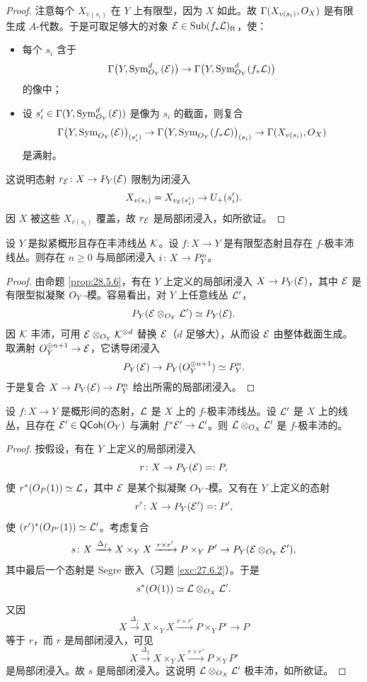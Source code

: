 \begin{proof}
注意每个 $X_{v(s_i)}$ 在 $Y$ 上有限型，因为 $X$ 如此。故 $\Gamma(X_{v(s_i)},O_X)$ 是有限生成 $A$-代数。于是可取足够大的对象 $\mathcal{E}\in\operatorname{Sub}(f_*\mathcal{L})_{\mathrm{ft}}$，使：
\begin{itemize}[leftmargin=1.6em,itemsep=0.25ex]
  \item 每个 $s_i$ 含于
  \[
  \Gamma\bigl(Y,\operatorname{Sym}^d_{O_Y}(\mathcal{E})\bigr)\to\Gamma\bigl(Y,\operatorname{Sym}^d_{O_Y}(f_*\mathcal{L})\bigr)
  \]
  的像中；
  \item 设 $s'_i\in\Gamma(Y,\operatorname{Sym}^d_{O_Y}(\mathcal{E}))$ 是像为 $s_i$ 的截面，则复合
  \[
  \Gamma\bigl(Y,\operatorname{Sym}_{O_Y}(\mathcal{E})\bigr)_{(s'_i)}\to\Gamma\bigl(Y,\operatorname{Sym}_{O_Y}(f_*\mathcal{L})\bigr)_{(s_i)}\to\Gamma(X_{v(s_i)},O_X)
  \]
  是满射。
\end{itemize}
这说明态射 $r_{\mathcal{E}}\colon X\to P_Y(\mathcal{E})$ 限制为闭浸入
\[
X_{v(s_i)}=X_{v_{\mathcal{E}}(s'_i)}\to U_+(s'_i).
\]
因 $X$ 被这些 $X_{v(s_i)}$ 覆盖，故 $r_{\mathcal{E}}$ 是局部闭浸入，如所欲证。
\end{proof}

\begin{corollary}\label{cor:28.5.7}
设 $Y$ 是拟紧概形且存在丰沛线丛 $\mathcal{K}$。设 $f\colon X\to Y$ 是有限型态射且存在 $f$-极丰沛线丛。则存在 $n\ge 0$ 与局部闭浸入 $i\colon X\to P^n_Y$。
\end{corollary}

\begin{proof}
由命题 \ref{prop:28.5.6}，有在 $Y$ 上定义的局部闭浸入 $X\to P_Y(\mathcal{E})$，其中 $\mathcal{E}$ 是有限型拟凝聚 $O_Y$-模。容易看出，对 $Y$ 上任意线丛 $\mathcal{L}'$，
\[
P_Y(\mathcal{E}\otimes_{O_Y}\mathcal{L}')\simeq P_Y(\mathcal{E}).
\]
因 $\mathcal{K}$ 丰沛，可用 $\mathcal{E}\otimes_{O_Y}\mathcal{K}^{\otimes d}$ 替换 $\mathcal{E}$（$d$ 足够大），从而设 $\mathcal{E}$ 由整体截面生成。取满射 $O_Y^{\oplus n+1}\to\mathcal{E}$，它诱导闭浸入
\[
P_Y(\mathcal{E})\to P_Y(O_Y^{\oplus n+1})\simeq P^n_Y.
\]
于是复合 $X\to P_Y(\mathcal{E})\to P^n_Y$ 给出所需的局部闭浸入。
\end{proof}

\begin{lemma}\label{lem:28.5.8}
设 $f\colon X\to Y$ 是概形间的态射，$\mathcal{L}$ 是 $X$ 上的 $f$-极丰沛线丛。设 $\mathcal{L}'$ 是 $X$ 上的线丛，且存在 $\mathcal{E}'\in\mathsf{QCoh}(O_Y)$ 与满射 $f^*\mathcal{E}'\to\mathcal{L}'$。则 $\mathcal{L}\otimes_{O_X}\mathcal{L}'$ 是 $f$-极丰沛的。
\end{lemma}

\begin{proof}
按假设，有在 $Y$ 上定义的局部闭浸入
\[
r\colon X\to P_Y(\mathcal{E})=:P,
\]
使 $r^*(O_P(1))\simeq\mathcal{L}$，其中 $\mathcal{E}$ 是某个拟凝聚 $O_Y$-模。又有在 $Y$ 上定义的态射
\[
r'\colon X\to P_Y(\mathcal{E}')=:P',
\]
使 $(r')^*(O_{P'}(1))\simeq\mathcal{L}'$。考虑复合
\[
s\colon X\xrightarrow{\Delta_f}X\times_Y X\xrightarrow{r\times r'}P\times_Y P'\to P_Y(\mathcal{E}\otimes_{O_Y}\mathcal{E}'),
\]
其中最后一个态射是 Segre 嵌入（习题 \ref{exc:27.6.2}）。于是
\[
s^*(O(1))\simeq\mathcal{L}\otimes_{O_X}\mathcal{L}'.
\]
又因
\[
X\xrightarrow{\Delta_f}X\times_Y X\xrightarrow{r\times r'}P\times_Y P'\to P
\]
等于 $r$，而 $r$ 是局部闭浸入，可见
\[
X\xrightarrow{\Delta_f}X\times_Y X\xrightarrow{r\times r'}P\times_Y P'
\]
是局部闭浸入。故 $s$ 是局部闭浸入。这说明 $\mathcal{L}\otimes_{O_X}\mathcal{L}'$ 极丰沛，如所欲证。
\end{proof}

